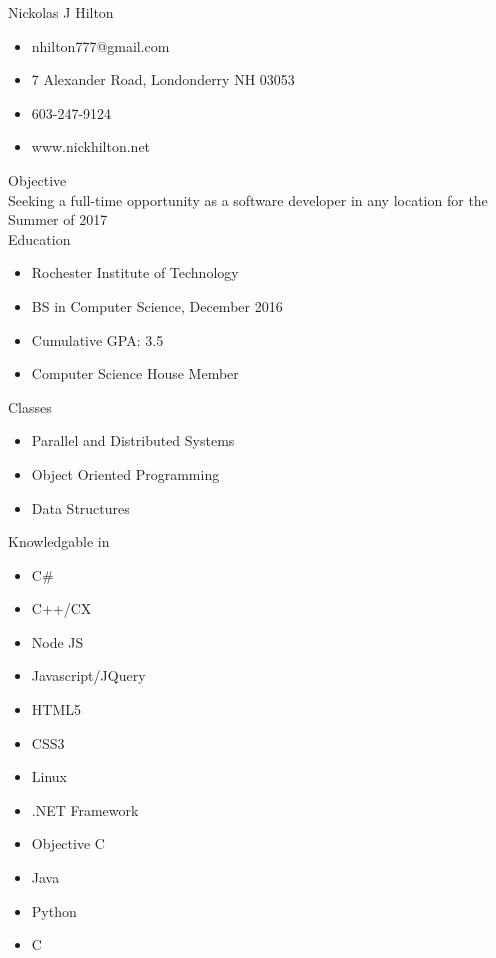 \documentclass{article}
\begin{document}
{\LARGE Nickolas J Hilton } \\
\begin{itemize}
  \item nhilton777@gmail.com \\
  \item 7 Alexander Road, Londonderry NH 03053 \\
  \item 603-247-9124 \\
  \item www.nickhilton.net \\
\end{itemize}
{\Large Objective} \\
Seeking a full-time opportunity as a software developer in any location for the 
Summer of 2017 \\
{\Large Education } \\
\begin{itemize}
  \item Rochester Institute of Technology \\
  \item BS in Computer Science, December 2016 \\
  \item Cumulative GPA: 3.5 \\
  \item Computer Science House Member \\
\end{itemize}
{\Large Classes } \\
\begin{itemize}
  \item Parallel and Distributed Systems \\
  \item Object Oriented Programming \\
  \item Data Structures \\
\end{itemize}
{\Large Knowledgable in } \\
\begin {itemize}
  \item C\# \\
  \item C++/CX \\
  \item Node JS \\
  \item Javascript/JQuery \\
  \item HTML5 \\
  \item CSS3 \\
  \item Linux \\
  \item .NET Framework \\
  \item Objective C \\
  \item Java \\
  \item Python \\
  \item C \\
\end{itemize}
\end{document}
